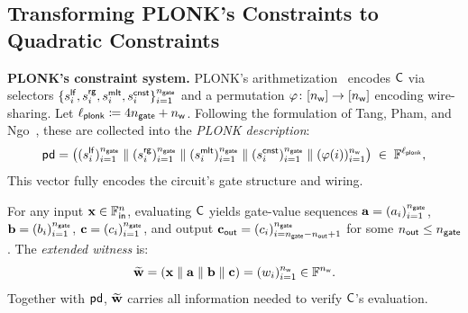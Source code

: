 \subsection{Transforming PLONK's Constraints to Quadratic Constraints}
\label{subsection:transforming-plonk-arithmetization-to-quadratic-constraints}

\noindent\textbf{PLONK's constraint system.}
PLONK's arithmetization~\cite{EPRINT:GabWilCio19} encodes $\mathsf{C}$
via selectors $\{s_i^{\mathsf{lf}}, s_i^{\mathsf{rg}}, s_i^{\mathsf{mlt}}, s_i^{\mathsf{cnst}}\}_{i = 1}^{n_\mathsf{gate}}$
and a permutation $\varphi \colon [n_\mathsf{w}] \to [n_\mathsf{w}]$ encoding wire-sharing.
Let $\ell_\mathsf{plonk} \coloneqq 4n_\mathsf{gate} + n_\mathsf{w}$.
Following the formulation of Tang, Pham, and Ngo~\cite{EPRINT:TanPhaNgo24},
these are collected into the \emph{PLONK description}:
\begin{equation}\label{equation:plonk-circuit-description}
\mathsf{pd} =
\bigl(
(s_i^{\mathsf{lf}})_{i = 1}^{n_\mathsf{gate}}
\;\|\;
(s_i^{\mathsf{rg}})_{i = 1}^{n_\mathsf{gate}}
\;\|\;
(s_i^{\mathsf{mlt}})_{i = 1}^{n_\mathsf{gate}}
\;\|\;
(s_i^{\mathsf{cnst}})_{i = 1}^{n_\mathsf{gate}}
\;\|\;
(\varphi(i))_{i = 1}^{n_\mathsf{w}}
\bigr)
\;\in\; \mathbb{F}^{\ell_\mathsf{plonk}},
\end{equation}
This vector fully encodes the circuit's gate structure and wiring.

For any input $\mathbf{x} \in \mathbb{F}^n_\mathsf{in}$, evaluating $\mathsf{C}$ yields gate-value sequences
$\mathbf{a} = (a_i)_{i = 1}^{n_\mathsf{gate}}$,
$\mathbf{b} = (b_i)_{i = 1}^{n_\mathsf{gate}}$,
$\mathbf{c} = (c_i)_{i = 1}^{n_\mathsf{gate}}$,
and output $\mathbf{c}_\mathsf{out} = (c_i)_{i = n_\mathsf{gate} - n_\mathsf{out} + 1}^{n_\mathsf{gate}}$ for some $n_\mathsf{out} \leq n_\mathsf{gate}$.
The \emph{extended witness} is:
\begin{equation}\label{equation:plonk-tilde-w}
\widetilde{\mathbf{w}} = (\mathbf{x} \;\|\; \mathbf{a} \;\|\; \mathbf{b} \;\|\; \mathbf{c})
= (w_i)_{i = 1}^{n_\mathsf{w}} \in \mathbb{F}^{n_\mathsf{w}}.
\end{equation}
Together with $\mathsf{pd}$, $\widetilde{\mathbf{w}}$ carries all information
needed to verify $\mathsf{C}$'s evaluation.

